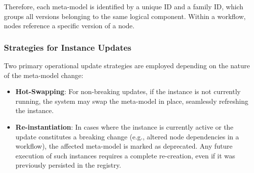 \noindent
Therefore, each meta-model is identified by a unique ID and a family ID, which groups all versions belonging to the same logical component. Within a workflow, nodes reference a specific version of a node.






\subsubsection{Strategies for Instance Updates}
Two primary operational update strategies are employed depending on the nature of the meta-model change:


\begin{itemize}[leftmargin=*, label=--] 
    \item \textbf{Hot-Swapping}: For non-breaking updates, if the instance is not currently running, the system may swap the meta-model in place, seamlessly refreshing the instance.
    \item \textbf{Re-instantiation}: In cases where the instance is currently active or the update constitutes a breaking change (e.g., altered node dependencies in a workflow), the affected meta-model is marked as deprecated. Any future execution of such instances requires a complete re-creation, even if it was previously persisted in the registry.
\end{itemize}








